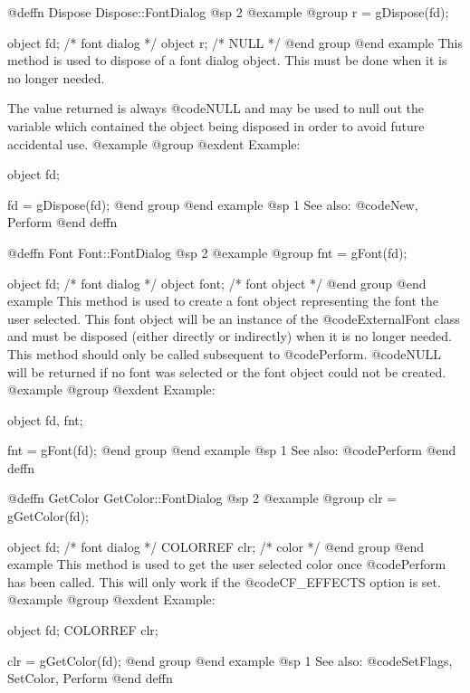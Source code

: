 @deffn {Dispose} Dispose::FontDialog
@sp 2
@example
@group
r = gDispose(fd);

object  fd;     /*  font dialog   */
object  r;      /*  NULL          */
@end group
@end example
This method is used to dispose of a font dialog object.  This must
be done when it is no longer needed.

The value returned is always @code{NULL} and may be used to null out
the variable which contained the object being disposed in order to
avoid future accidental use.
@example
@group
@exdent Example:

object  fd;

fd = gDispose(fd);
@end group
@end example
@sp 1
See also:  @code{New, Perform}
@end deffn











@deffn {Font} Font::FontDialog
@sp 2
@example
@group
fnt = gFont(fd);

object  fd;     /*  font dialog  */
object  font;   /*  font object  */
@end group
@end example
This method is used to create a font object representing the font the
user selected.  This font object will be an instance of the
@code{ExternalFont} class and must be disposed (either directly or
indirectly) when it is no longer needed.  This method should only
be called subsequent to @code{Perform}.  @code{NULL} will be returned
if no font was selected or the font object could not be created.
@example
@group
@exdent Example:

object  fd, fnt;

fnt = gFont(fd);
@end group
@end example
@sp 1
See also:  @code{Perform}
@end deffn











@deffn {GetColor} GetColor::FontDialog
@sp 2
@example
@group
clr = gGetColor(fd);

object   fd;    /*  font dialog  */
COLORREF clr;   /*  color        */
@end group
@end example
This method is used to get the user selected color once @code{Perform}
has been called.  This will only work if the @code{CF_EFFECTS} option
is set.
@example
@group
@exdent Example:

object  fd;
COLORREF clr;

clr = gGetColor(fd);
@end group
@end example
@sp 1
See also:  @code{SetFlags, SetColor, Perform}
@end deffn














